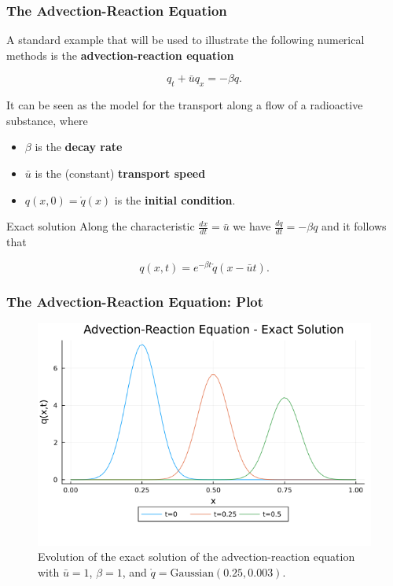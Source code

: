 \documentclass{beamer}
\renewcommand{\emph}[1]{\textcolor{tum}{\textbf{#1}}}
\begin{document}
\begin{frame}
	\frametitle{The Advection-Reaction Equation}

	A standard example that will be used to illustrate the following numerical methods is the \emph{advection-reaction equation}

	\begin{equation}\label{eq:advec}
		q_t + \bar{u}q_x=-\beta q.
	\end{equation}

	It can be seen as the model for the transport along a flow of a radioactive substance, where

	\begin{itemize}
		\item $\beta$ is the \emph{decay rate}
		\item $\bar{u}$ is the (constant) \emph{transport speed}
		\item $q(x,0)= \mathring{q}(x)$ is the \emph{initial condition}.
	\end{itemize}
	\pause
	\begin{block}{Exact solution}
		Along the characteristic $\frac{dx}{dt}=\bar{u}$ we have $\frac{dq}{dt}=-\beta q$ and it follows that

		\begin{equation}\label{eq:advec_sol}
			q(x,t) = e^{-\beta t}\mathring{q}(x-\bar{u}t).
		\end{equation}
	\end{block}

\end{frame}

\begin{frame}
	\frametitle{The Advection-Reaction Equation: Plot}
	\begin{figure}[!ht]
		\centering
		\includegraphics[width=.7\textwidth]{../Advection.png}

		\caption{Evolution of the exact solution of the advection-reaction equation with $\bar{u}=1$, $\beta=1$, and $\mathring{q}=\text{Gaussian}(0.25,0.003)$.}
		\label{fig:exact}
	\end{figure}
\end{frame}
\end{document}
